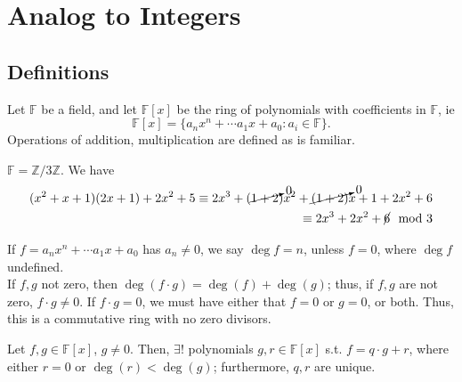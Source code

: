 \documentclass[12pt,oneside]{article}
\begin{document}
\section{Analog to Integers}

\subsection{Definitions}

\begin{definition}
  Let $\mathbb{F}$ be a field, and let $\mathbb{F}[x]$ be the ring of polynomials with coefficients in $\mathbb{F}$, ie \[\mathbb{F}[x] = \{a_n x^{n} + \cdots a_1 x + a_0 : a_i \in \mathbb{F}\}.\]
  Operations of addition, multiplication are defined as is familiar.
\end{definition}

\begin{example}
  $\mathbb{F} = \mathbb{Z}/3 \mathbb{Z}$. We have \begin{align*}
    (x^2 + x + 1)(2x + 1) + 2x^2 + 5 \equiv 2x^3 + (\cancelto{0}{1+2})x^2 + \cancelto{0}{(1+2)}x + 1 + 2x^2 + 6\\
    \equiv 2x^3 + 2x^2 + \cancel{6} \mod 3
  \end{align*}
\end{example}

\begin{definition}[$\deg$]
  If $f = a_n x^n + \cdots a_1 x + a_0$ has $a_n \neq 0$, we say $\deg f = n$, unless $f = 0$, where $\deg f$ undefined.\\
  If $f,g$ not zero, then $\deg (f \cdot g) = \deg (f) + \deg (g)$; thus, if $f,g$ are not zero, $f \cdot g \neq 0$. If $f \cdot g = 0$, we must have either that $f = 0$ or $g = 0$, or both. Thus, this is a commutative ring with no zero divisors. 
\end{definition}

\begin{theorem}
  Let $f,g \in \mathbb{F}[x]$, $g \neq 0$. Then, $\exists !$ polynomials $g, r \in \mathbb{F}[x]$ s.t. $f = q \cdot g + r$, where either $r = 0$ or $\deg (r) < \deg (g)$; furthermore, $q,r$ are unique.
\end{theorem}
\end{document}
